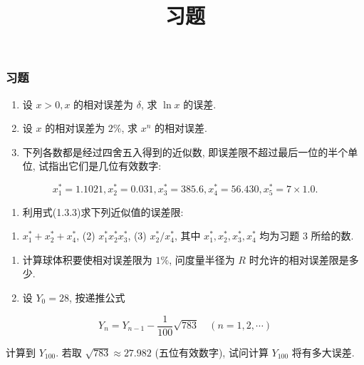 \documentclass[
  10pt,
  fontset=fandol]{ctexart}
\title{习题}
\author{}
\date{}
\providecommand{\tightlist}{%
  \setlength{\itemsep}{0pt}\setlength{\parskip}{0pt}}
\begin{document}
\maketitle

\subsubsection{习题}\label{ux4e60ux9898}

\begin{enumerate}
\def\labelenumi{\arabic{enumi}.}
\item
  设 \(x>0, x\) 的相对误差为 \(\delta\), 求 \(\ln x\) 的误差.
\item
  设 \(x\) 的相对误差为 \(2\%\), 求 \(x^n\) 的相对误差.
\item
  下列各数都是经过四舍五入得到的近似数, 即误差限不超过最后一位的半个单位, 试指出它们是几位有效数字:
\end{enumerate}

\[
x_1^* = 1.1021, x_2^* = 0.031, x_3^* = 385.6, x_4^* = 56.430, x_5^* = 7 \times 1.0.
\]

\begin{enumerate}
\def\labelenumi{\arabic{enumi}.}
\setcounter{enumi}{3}
\tightlist
\item
  利用式(1.3.3)求下列近似值的误差限:
\end{enumerate}

\begin{enumerate}
\def\labelenumi{(\arabic{enumi})}
\tightlist
\item
  \(x_1^* + x_2^* + x_4^*\), (2) \(x_1^* x_2^* x_3^*\), (3) \(x_2^* / x_4^*\), 其中 \(x_1^*, x_2^*, x_3^*, x_4^*\) 均为习题 3 所给的数.
\end{enumerate}

\begin{enumerate}
\def\labelenumi{\arabic{enumi}.}
\setcounter{enumi}{4}
\item
  计算球体积要使相对误差限为 \(1\%\), 问度量半径为 \(R\) 时允许的相对误差限是多少.
\item
  设 \(Y_0=28\), 按递推公式
\end{enumerate}

\[
Y_n = Y_{n-1} - \frac{1}{100} \sqrt{783} \quad (n=1,2,\cdots)
\]

计算到 \(Y_{100}\). 若取 \(\sqrt{783} \approx 27.982\) (五位有效数字), 试问计算 \(Y_{100}\) 将有多大误差.
\end{document}
